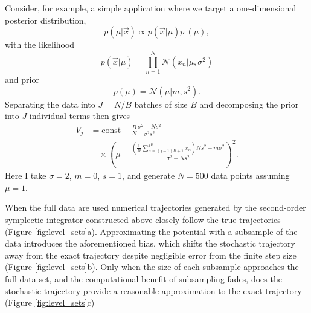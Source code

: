 \documentclass{article}
\begin{document}
Consider, for example, a simple application where we target a one-dimensional
posterior distribution,
%
\begin{equation} \label{posterior}
p \! \left( \mu | \vec{x} \right) \propto p \! \left( \vec{x} | \mu \right) p\ \! \left( \mu \right),
\end{equation}
%
with the likelihood
%
\begin{equation*}
p \! \left( \vec{x} | \mu \right) = \prod_{n = 1}^{N} \mathcal{N} \! \left( x_{n} | \mu, \sigma^{2} \right)
\end{equation*}
%
and prior
%
\begin{equation*}
p \! \left( \mu \right) = \mathcal{N} \! \left( \mu | m, s^{2} \right). 
\end{equation*}
%
Separating the data into $J = N / B$ batches of size $B$ and decomposing the
prior into $J$ individual terms then gives
%
\begin{align*}
V_{j} &= \mathrm{const} + 
\frac{B}{N} \frac{ \sigma^{2} + N s^{2}  }{ \sigma^{2} s^{2} }
\\
& \quad
\times \left( \mu - 
\frac{ \left( \frac{1}{B} \sum_{n = (j - 1) B + 1}^{j B} x_{n} \right) N s^{2}  + m \sigma^{2} }
{ \sigma^{2} + N s^{2} } 
\right)^{2}.
\end{align*}
%
Here I take $\sigma = 2$, $m = 0$, $s = 1$, and generate $N = 500$ data points
assuming $\mu = 1$.

When the full data are used numerical trajectories generated by the second-order 
symplectic integrator constructed above closely follow the true trajectories 
(Figure \ref{fig:level_sets}a).  Approximating the potential with a subsample of the data 
introduces the aforementioned bias, which shifts the stochastic trajectory away from the 
exact trajectory despite negligible error from the finite step size (Figure \ref{fig:level_sets}b).
Only when the size of each subsample approaches the full data set, and the computational
benefit of subsampling fades, does the stochastic trajectory provide a reasonable
approximation to the exact trajectory (Figure \ref{fig:level_sets}c)
\end{document}
